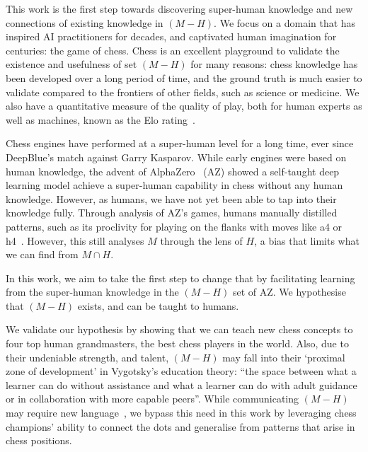 \documentclass{article}
\begin{document}
This work is the first step towards discovering super-human knowledge and new connections of existing knowledge in $(M - H)$. 
We focus on a domain that has inspired AI practitioners for decades, and captivated human imagination for centuries: the game of chess. Chess is an excellent playground to validate the existence and usefulness of set $(M-H)$ for many reasons: chess knowledge has been developed over a long period of time, and the ground truth is much easier to validate compared to the frontiers of other fields, such as science or medicine. We also have a quantitative measure of the quality of play, both for human experts as well as machines, known as the Elo rating~\citep{wiki:elo}. 

Chess engines have performed at a super-human level for a long time, ever since DeepBlue's match against Garry Kasparov. While early engines were based on human knowledge, the advent of AlphaZero~\citep{silver2017mastering} (AZ) showed a self-taught deep learning model achieve a super-human capability in chess without any human knowledge. 
However, as humans, we have not yet been able to tap into their knowledge fully. Through analysis of AZ's games, humans manually distilled patterns, such as its proclivity for playing on the flanks with moves like a4 or h4~\citep{game_changer}. However, this still analyses $M$ through the lens of $H$, a bias that limits what we can find from $M \cap H$. 

In this work, we aim to take the first step to change that by facilitating learning from the super-human knowledge in the
$(M - H)$ set of AZ. We hypothesise that $(M - H)$ exists, and can be taught to humans. 

We validate our hypothesis by showing that we can teach new chess concepts to four top human grandmasters, the best chess players in the world. Also, due to their undeniable strength, and talent, $(M - H)$ may fall into their `proximal zone of development' in Vygotsky's education theory: ``the space between what a learner can do without assistance and what a learner can do with adult guidance or in collaboration with more capable peers''. While communicating $(M - H)$ may require new language~\citep{iclrkeynote_been_2022}, we bypass this need in this work by leveraging chess champions' ability to connect the dots and generalise from patterns that arise in chess positions. 
\end{document}
